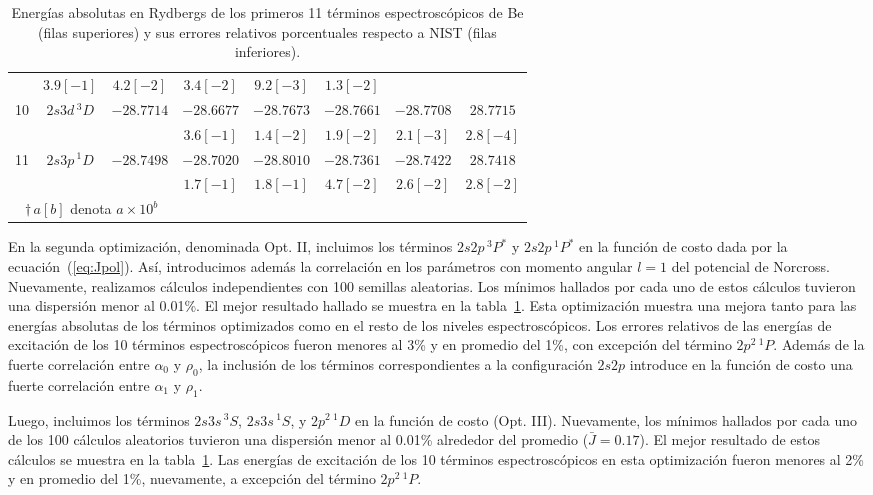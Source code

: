 \begin{table}
\begin{tabular}{|*{8}{c|}}
  & $3.9[-1]$   & $4.2[-2]$  & $3.4[-2]$  & $9.2[-3]$  & $1.3[-2]$ \\  
\rowcolor{mygray} 
10& $2s3d\,^3D$ & $-28.7714$ 
  & $-28.6677$  & $-28.7673$ & $-28.7661$ & $-28.7708$ & $28.7715$ \\ & & 
  & $3.6[-1]$   & $1.4[-2]$  & $1.9[-2]$  & $2.1[-3]$  & $2.8[-4]$ \\  
\rowcolor{mygray} 
11& $2s3p\,^1D$ & $-28.7498$ 
  & $-28.7020$  & $-28.8010$ & $-28.7361$ & $-28.7422$ & $28.7418$ \\ & & 
  & $1.7[-1]$   & $1.8[-1]$  & $4.7[-2]$  & $2.6[-2]$  & $2.8[-2]$ \\ 
\hline\multicolumn{3}{c}{$\dagger\,a[b]$ denota $a\times 10^b$} \\
\end{tabular}
\caption[Energías absolutas de Be.]
{Energías absolutas en Rydbergs de los primeros 11 términos 
espectroscópicos de Be (filas superiores) y sus errores relativos 
porcentuales respecto a NIST (filas inferiores).}
\label{tab:optpol}
\end{table}

En la segunda optimización, denominada Opt. II, incluimos los términos 
$2s2p\,^3P^*$ y $2s2p\,^1P^*$ en la función de costo dada por la 
ecuación~(\ref{eq:Jpol}). Así, introducimos además la correlación en los 
parámetros con momento angular $l=1$ del potencial de Norcross. 
Nuevamente, realizamos cálculos independientes con 100 semillas aleatorias. 
Los mínimos hallados por cada uno de estos cálculos tuvieron una 
dispersión menor al 0.01\%. El mejor resultado hallado se muestra en la 
tabla~\ref{tab:optpol}. Esta optimización muestra una mejora tanto para 
las energías absolutas de los términos optimizados como en el resto de 
los niveles espectroscópicos. Los errores relativos de las energías de 
excitación de los 10 términos espectroscópicos fueron menores al 3\% y en 
promedio del 1\%, con excepción del término $2p^2\,^1P$. Además de la 
fuerte correlación entre $\alpha_0$ y $\rho_0$, la inclusión de los 
términos correspondientes a la configuración $2s2p$ introduce en la 
función de costo una fuerte correlación entre $\alpha_1$ y $\rho_1$.

Luego, incluimos los términos $2s3s\,^3S$, $2s3s\,^1S$, y $2p^2\,^1D$ en 
la función de costo (Opt. III). Nuevamente, los mínimos hallados por cada 
uno de los 100 cálculos aleatorios tuvieron una dispersión menor al 
0.01\% alrededor del promedio ($\bar{J}=0.17$). El mejor resultado de 
estos cálculos se muestra en la tabla~\ref{tab:optpol}. Las energías de 
excitación de los 10 términos espectroscópicos en esta optimización 
fueron menores al 2\% y en promedio del 1\%, nuevamente, a excepción del 
término $2p^2\,^1P$. 

